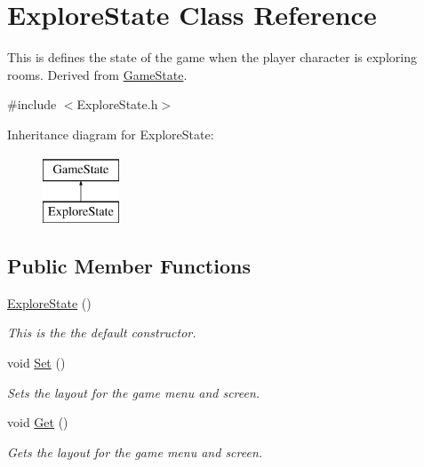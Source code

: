\hypertarget{classExploreState}{\section{Explore\-State Class Reference}
\label{classExploreState}
}


This is defines the state of the game when the player character is exploring rooms. Derived from \hyperlink{classGameState}{Game\-State}.  




{\ttfamily \#include $<$Explore\-State.\-h$>$}

Inheritance diagram for Explore\-State\-:\begin{figure}[H]
\begin{center}
\leavevmode
\includegraphics[height=2.000000cm]{classExploreState}
\end{center}
\end{figure}
\subsection*{Public Member Functions}
\begin{DoxyCompactItemize}
\item 
\hypertarget{classExploreState_ac10ad3cee219e8233a2c279392b70d52}{\hyperlink{classExploreState_ac10ad3cee219e8233a2c279392b70d52}{Explore\-State} ()}\label{classExploreState_ac10ad3cee219e8233a2c279392b70d52}

\begin{DoxyCompactList}\small\item\em This is the the default constructor. \end{DoxyCompactList}\item 
\hypertarget{classExploreState_a8fb38f9fca513b87d914d077a0f2652b}{void \hyperlink{classExploreState_a8fb38f9fca513b87d914d077a0f2652b}{Set} ()}\label{classExploreState_a8fb38f9fca513b87d914d077a0f2652b}

\begin{DoxyCompactList}\small\item\em Sets the layout for the game menu and screen. \end{DoxyCompactList}\item 
\hypertarget{classExploreState_ace76d7a24bcb85f6f0a0fe0d0e763e21}{void \hyperlink{classExploreState_ace76d7a24bcb85f6f0a0fe0d0e763e21}{Get} ()}\label{classExploreState_ace76d7a24bcb85f6f0a0fe0d0e763e21}

\begin{DoxyCompactList}\small\item\em Gets the layout for the game menu and screen. \end{DoxyCompactList}\end{DoxyCompactItemize}
